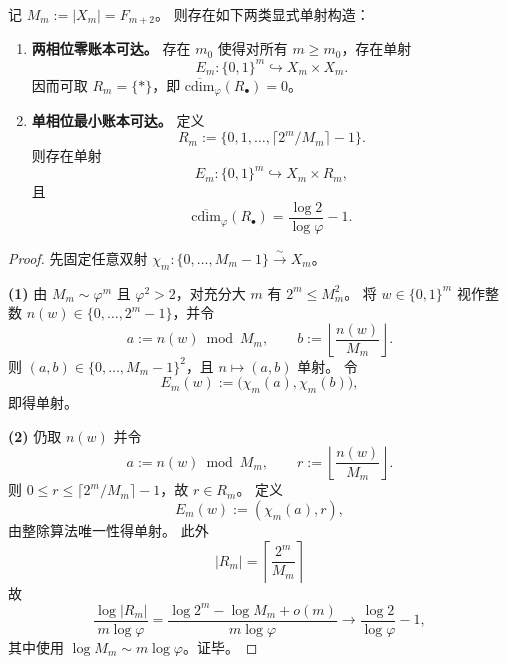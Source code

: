 \begin{theorem}\label{thm:conclusion-rate-cdim-achievability}
记 \(M_m:=|X_m|=F_{m+2}\)。
则存在如下两类显式单射构造：
\begin{enumerate}
  \item \textbf{两相位零账本可达。}
  存在 \(m_0\) 使得对所有 \(m\ge m_0\)，存在单射
  \[
  E_m:\{0,1\}^m\hookrightarrow X_m\times X_m.
  \]
  因而可取 \(R_m=\{\ast\}\)，即 \(\overline{\mathrm{cdim}}_{\varphi}(R_\bullet)=0\)。

  \item \textbf{单相位最小账本可达。}
  定义
  \[
  R_m:=\{0,1,\dots,\lceil 2^m/M_m\rceil-1\}.
  \]
  则存在单射
  \[
  E_m:\{0,1\}^m\hookrightarrow X_m\times R_m,
  \]
  且
  \[
  \overline{\mathrm{cdim}}_{\varphi}(R_\bullet)=\frac{\log 2}{\log\varphi}-1.
  \]
\end{enumerate}
\end{theorem}
\begin{proof}
先固定任意双射 \(\chi_m:\{0,\dots,M_m-1\}\xrightarrow{\sim}X_m\)。

\textbf{(1)} 由 \(M_m\sim \varphi^m\) 且 \(\varphi^2>2\)，对充分大 \(m\) 有 \(2^m\le M_m^2\)。
将 \(w\in\{0,1\}^m\) 视作整数 \(n(w)\in\{0,\dots,2^m-1\}\)，并令
\[
a:=n(w)\bmod M_m,\qquad
b:=\left\lfloor\frac{n(w)}{M_m}\right\rfloor.
\]
则 \((a,b)\in\{0,\dots,M_m-1\}^2\)，且 \(n\mapsto(a,b)\) 单射。
令
\[
E_m(w):=\bigl(\chi_m(a),\chi_m(b)\bigr),
\]
即得单射。

\textbf{(2)} 仍取 \(n(w)\) 并令
\[
a:=n(w)\bmod M_m,\qquad
r:=\left\lfloor\frac{n(w)}{M_m}\right\rfloor.
\]
则 \(0\le r\le \lceil 2^m/M_m\rceil-1\)，故 \(r\in R_m\)。
定义
\[
E_m(w):=(\chi_m(a),r),
\]
由整除算法唯一性得单射。
此外
\[
|R_m|=\left\lceil\frac{2^m}{M_m}\right\rceil
\]
故
\[
\frac{\log|R_m|}{m\log\varphi}
=
\frac{\log 2^m-\log M_m+o(m)}{m\log\varphi}
\longrightarrow
\frac{\log 2}{\log\varphi}-1,
\]
其中使用 \(\log M_m\sim m\log\varphi\)。证毕。
\end{proof}

